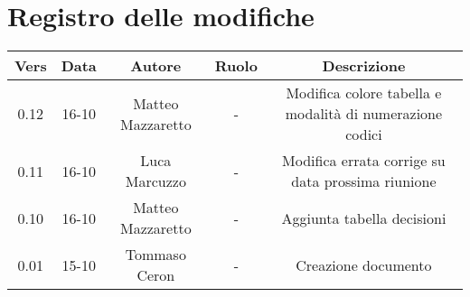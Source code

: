 \section{Registro delle modifiche}

\begin{table}[htbp]
	\begin{tabular}{|c|c|c|c|c|}
		\hline
		\rowcolor[gray]{0.9}
		Vers & Data & Autore & Ruolo & Descrizione \\
		\hline
		0.12 & 16-10 & Matteo Mazzaretto & - & Modifica colore tabella e modalità di numerazione codici\\
		\hline
		0.11 & 16-10 & Luca Marcuzzo & - & Modifica errata corrige su data prossima riunione \\
		\hline
		0.10 & 16-10 & Matteo Mazzaretto & - & Aggiunta tabella decisioni \\
		\hline
		0.01 & 15-10 & Tommaso Ceron & - & Creazione documento \\
		\hline
	\end{tabular}
\end{table}
